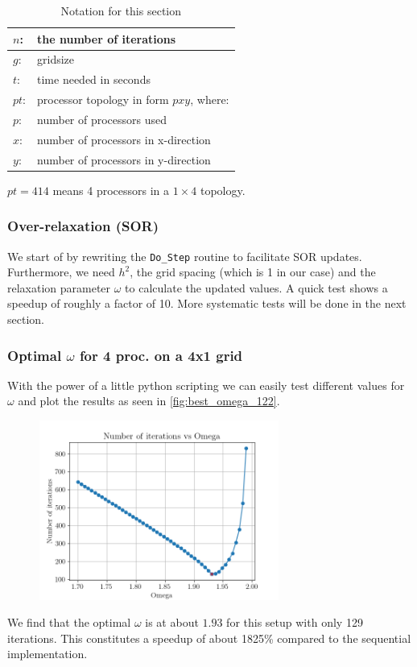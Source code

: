 \begin{table}[h!]
    \centering
    \begin{tabular}{|l|l|}
        \hline
        $n$:  &the number of iterations\\\hline
        $g$:  &gridsize\\\hline
        $t$:  &time needed in seconds\\\hline
        $pt$: & processor topology in form $pxy$, where:\\
        $p$:  &number of processors used\\
        $x$:  &number of processors in x-direction\\
        $y$:  &number of processors in y-direction\\\hline
       \end{tabular}
    \caption{Notation for this section}
\end{table}
$pt = 414$ means 4 processors in a $1\times 4$ topology. 

\subsubsection{Over-relaxation (SOR)}
We start of by rewriting the \texttt{Do\_Step} routine to facilitate SOR updates. Furthermore, we need $h^2$, the grid spacing (which is 1 in our case) and the relaxation parameter $\omega$ to calculate the updated values. A quick test shows a speedup of roughly a factor of 10. More systematic tests will be done in the next section.
\subsubsection{Optimal $\omega$ for 4 proc. on a 4x1 grid}
With the power of a little python scripting we can easily test different values for $\omega$ and plot the results as seen in \autoref{fig:best_omega_122}. 

\begin{figure}[H]
    \centering
    \includegraphics[width=0.7\textwidth]{../fig/lab1/best_omega_122.png}
    \caption{}
    \label{fig:best_omega_122}
\end{figure}
We find that the optimal $\omega$ is at about $1.93$ for this setup with only 129 iterations. This constitutes a speedup of about 1825\% compared to the sequential implementation.

